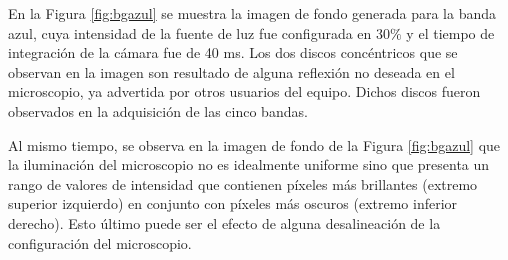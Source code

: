 \begin{figure}[H]
\begin{floatrow}
		\end{floatrow}
	\end{figure}
	\hspace{0.5cm}En la Figura \ref{fig:bgazul} se muestra la imagen de fondo generada para la banda azul, cuya intensidad de la fuente de luz fue configurada en 30$\%$ y el tiempo de integración de la cámara fue de 40 ms. Los dos discos concéntricos que se observan en la imagen son resultado de alguna reflexión no deseada en el microscopio, ya advertida por otros usuarios del equipo. Dichos discos fueron observados en la adquisición de las cinco bandas. 
	
Al mismo tiempo, se observa en la imagen de fondo de la Figura \ref{fig:bgazul} que la iluminación del microscopio no es idealmente uniforme sino que presenta un rango de valores de intensidad que contienen píxeles más brillantes (extremo superior izquierdo) en conjunto con píxeles más oscuros (extremo inferior derecho). Esto último puede ser el efecto de alguna desalineación de la configuración del microscopio.

